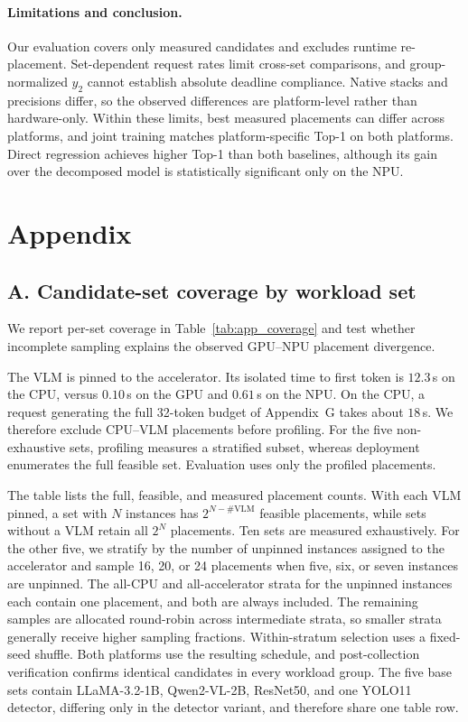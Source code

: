 \documentclass{article}
\begin{document}
\paragraph{Limitations and conclusion.}
Our evaluation covers only measured candidates and excludes runtime re-placement. Set-dependent request rates limit cross-set comparisons, and group-normalized $y_2$ cannot establish absolute deadline compliance. Native stacks and precisions differ, so the observed differences are platform-level rather than hardware-only. Within these limits, best measured placements can differ across platforms, and joint training matches platform-specific Top-1 on both platforms. Direct regression achieves higher Top-1 than both baselines, although its gain over the decomposed model is statistically significant only on the NPU.





\appendix
\section*{Appendix}


\subsection*{A. Candidate-set coverage by workload set}
We report per-set coverage in Table~\ref{tab:app_coverage} and test whether incomplete sampling explains the observed GPU--NPU placement divergence.

The VLM is pinned to the accelerator. Its isolated time to first token is $12.3$\,s on the CPU, versus $0.10$\,s on the GPU and $0.61$\,s on the NPU. On the CPU, a request generating the full 32-token budget of Appendix~G takes about $18$\,s. We therefore exclude CPU--VLM placements before profiling. For the five non-exhaustive sets, profiling measures a stratified subset, whereas deployment enumerates the full feasible set. Evaluation uses only the profiled placements.

The table lists the full, feasible, and measured placement counts. With each VLM pinned, a set with $N$ instances has $2^{N-\#\mathrm{VLM}}$ feasible placements, while sets without a VLM retain all $2^N$ placements. Ten sets are measured exhaustively. For the other five, we stratify by the number of unpinned instances assigned to the accelerator and sample 16, 20, or 24 placements when five, six, or seven instances are unpinned. The all-CPU and all-accelerator strata for the unpinned instances each contain one placement, and both are always included. The remaining samples are allocated round-robin across intermediate strata, so smaller strata generally receive higher sampling fractions. Within-stratum selection uses a fixed-seed shuffle. Both platforms use the resulting schedule, and post-collection verification confirms identical candidates in every workload group. The five base sets contain LLaMA-3.2-1B, Qwen2-VL-2B, ResNet50, and one YOLO11 detector, differing only in the detector variant, and therefore share one table row.
\end{document}
